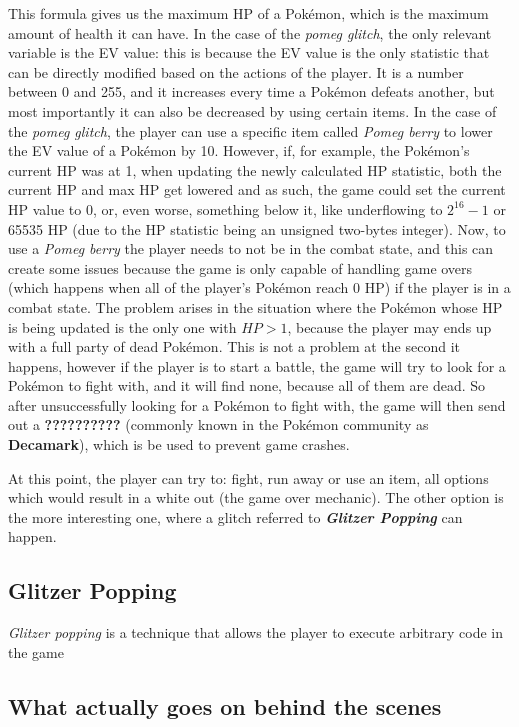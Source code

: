 \documentclass[a4paper]{usiinfbachelorproject}
\begin{document}
This formula gives us the maximum HP of a Pokémon, which is the maximum amount of health it can have. In the case of the \textit{pomeg glitch}, the only relevant variable is the EV value: this is because the EV value is the only statistic that can be directly modified based on the actions of the player. It is a number between 0 and 255, and it increases every time a Pokémon defeats another, but most importantly it can also be decreased by using certain items. In the case of the \textit{pomeg glitch}, the player can use a specific item called \textit{Pomeg berry} to lower the EV value of a Pokémon by 10. However, if, for example, the Pokémon's current HP was at 1, when updating the newly calculated HP statistic, both the current HP and max HP get lowered and as such, the game could set the current HP value to 0, or, even worse, something below it, like underflowing to $ 2^{16}-1$ or 65535 HP (due to the HP statistic being an unsigned two-bytes integer). Now, to use a \textit{Pomeg berry} the player needs to not be in the combat state, and this can create some issues because the game is only capable of handling game overs (which happens when all of the player's Pokémon reach 0 HP) if the player is in a combat state. The problem arises in the situation where the Pokémon whose HP is being updated is the only one with $HP > 1$, because the player may ends up with a full party of dead Pokémon. This is not a problem at the second it happens, however if the player is to start a battle, the game will try to look for a Pokémon to fight with, and it will find none, because all of them are dead. So after unsuccessfully looking for a Pokémon to fight with, the game will then send out a \textbf{??????????} (commonly known in the Pokémon community as \textbf{Decamark}), which is be used to prevent game crashes.

At this point, the player can try to: fight, run away or use an item, all options which would result in a white out (the game over mechanic). The other option is the more interesting one, where a glitch referred to \textit{\textbf{Glitzer Popping}} can happen.

\subsection{\textbf{Glitzer Popping}}
\textit{Glitzer popping} is a technique that allows the player to execute arbitrary code in the game


\subsection{\textbf{What actually goes on behind the scenes}}
\end{document}
